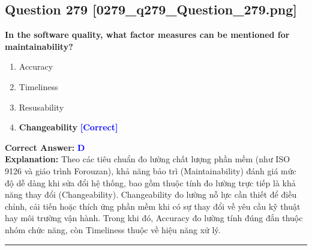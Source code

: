 \documentclass[11pt,a4paper]{article}
\begin{document}
\begin{minipage}{\textwidth}
\subsection*{Question 279 \quad \footnotesize{[0279\_q279\_Question\_279.png]}}
\noindent \textbf{In the software quality, what factor measures can be mentioned for maintainability?}

\begin{enumerate}[label=\Alph*.]
    \item Accuracy
    \item Timeliness
    \item Resusability
    \item \textbf{Changeability} \hfill \textcolor{blue}{\textbf{[Correct]}}
\end{enumerate}

\noindent \textbf{Correct Answer:} \textcolor{blue}{\textbf{D}} \\[2pt]
\noindent \textbf{Explanation:} Theo các tiêu chuẩn đo lường chất lượng phần mềm (như ISO 9126 và giáo trình Forouzan), khả năng bảo trì (Maintainability) đánh giá mức độ dễ dàng khi sửa đổi hệ thống, bao gồm thuộc tính đo lường trực tiếp là khả năng thay đổi (Changeability). Changeability đo lường nỗ lực cần thiết để điều chỉnh, cải tiến hoặc thích ứng phần mềm khi có sự thay đổi về yêu cầu kỹ thuật hay môi trường vận hành. Trong khi đó, Accuracy đo lường tính đúng đắn thuộc nhóm chức năng, còn Timeliness thuộc về hiệu năng xử lý.

\par\vspace{0.3cm}
\hrule
\vspace{0.3cm}
\end{minipage}
\end{document}
